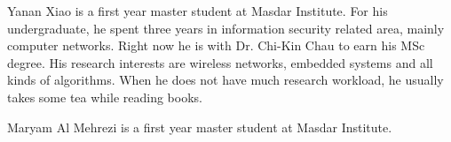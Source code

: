 \documentclass[12pt,journal,compsoc]{IEEEtran}
\begin{document}



\begin{IEEEbiographynophoto}{Yanan Xiao}
is a first year master student at Masdar Institute. For his undergraduate, he spent three years in information security related area, mainly computer networks. Right now he is with Dr. Chi-Kin Chau to earn his MSc degree. His research interests are wireless networks, embedded systems and all kinds of algorithms. When he does not have much research workload, he usually takes some tea while reading books.
\end{IEEEbiographynophoto}

\begin{IEEEbiographynophoto}{Maryam Al Mehrezi}
is a first year master student at Masdar Institute.
\end{IEEEbiographynophoto}


\vfill





\end{document}

